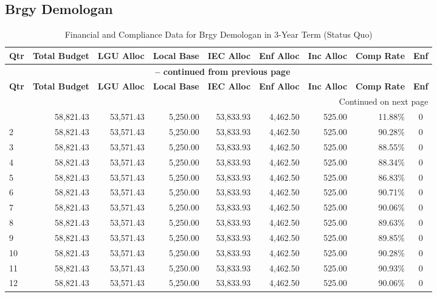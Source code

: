 \subsection{Brgy Demologan}
\begin{longtable}{lrrrrrrrc}
\caption{Financial and Compliance Data for Brgy Demologan in 3-Year Term (Status Quo)} \\
\toprule
\textbf{Qtr} & \textbf{Total Budget} & \textbf{LGU Alloc} & \textbf{Local Base} & \textbf{IEC Alloc} & \textbf{Enf Alloc} & \textbf{Inc Alloc} & \textbf{Comp Rate} & \textbf{Enf} \\
\midrule
\endfirsthead
\multicolumn{9}{c}{{\bfseries \tablename\ \thetable{} -- continued from previous page}} \\
\toprule
\textbf{Qtr} & \textbf{Total Budget} & \textbf{LGU Alloc} & \textbf{Local Base} & \textbf{IEC Alloc} & \textbf{Enf Alloc} & \textbf{Inc Alloc} & \textbf{Comp Rate} & \textbf{Enf} \\
\midrule
\endhead
\hline \multicolumn{9}{r}{{Continued on next page}} \\ \hline
\endfoot
\bottomrule
\endlastfoot
1 & 58,821.43 & 53,571.43 & 5,250.00 & 53,833.93 & 4,462.50 & 525.00 & 11.88\% & 0 \\
2 & 58,821.43 & 53,571.43 & 5,250.00 & 53,833.93 & 4,462.50 & 525.00 & 90.28\% & 0 \\
3 & 58,821.43 & 53,571.43 & 5,250.00 & 53,833.93 & 4,462.50 & 525.00 & 88.55\% & 0 \\
4 & 58,821.43 & 53,571.43 & 5,250.00 & 53,833.93 & 4,462.50 & 525.00 & 88.34\% & 0 \\
5 & 58,821.43 & 53,571.43 & 5,250.00 & 53,833.93 & 4,462.50 & 525.00 & 86.83\% & 0 \\
6 & 58,821.43 & 53,571.43 & 5,250.00 & 53,833.93 & 4,462.50 & 525.00 & 90.71\% & 0 \\
7 & 58,821.43 & 53,571.43 & 5,250.00 & 53,833.93 & 4,462.50 & 525.00 & 90.06\% & 0 \\
8 & 58,821.43 & 53,571.43 & 5,250.00 & 53,833.93 & 4,462.50 & 525.00 & 89.63\% & 0 \\
9 & 58,821.43 & 53,571.43 & 5,250.00 & 53,833.93 & 4,462.50 & 525.00 & 89.85\% & 0 \\
10 & 58,821.43 & 53,571.43 & 5,250.00 & 53,833.93 & 4,462.50 & 525.00 & 90.28\% & 0 \\
11 & 58,821.43 & 53,571.43 & 5,250.00 & 53,833.93 & 4,462.50 & 525.00 & 90.93\% & 0 \\
12 & 58,821.43 & 53,571.43 & 5,250.00 & 53,833.93 & 4,462.50 & 525.00 & 90.06\% & 0 \\
\end{longtable}
\clearpage

